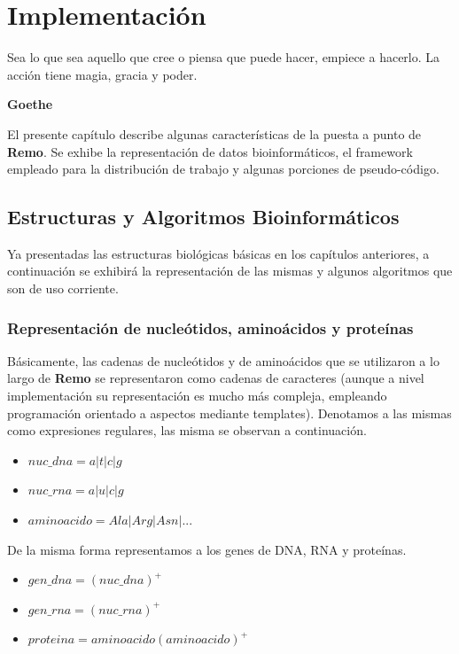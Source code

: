 \chapter{Implementación}
\label{implementacion}

\epigraph{Sea lo que sea aquello que cree
o piensa que puede hacer, empiece a hacerlo.
La acción tiene magia, gracia y poder.}%
{\textbf{Goethe}}

El presente capítulo describe algunas características de la puesta a punto de \textbf{Remo}. Se exhibe la representación de datos bioinformáticos, el framework empleado para la distribución de trabajo y algunas porciones de pseudo-código. 

\section{Estructuras y Algoritmos Bioinformáticos}	
\par Ya presentadas las estructuras biológicas básicas en los capítulos anteriores, a continuación se exhibirá la representación de las mismas y algunos algoritmos que son de uso corriente.

\subsection{Representación de nucleótidos, aminoácidos y proteínas}
\par Básicamente, las cadenas de nucleótidos y de aminoácidos que se utilizaron a lo largo de \textbf{Remo} se representaron como cadenas de caracteres (aunque a nivel implementación su representación es mucho más compleja, empleando programación orientado a aspectos mediante templates). Denotamos a las mismas como expresiones regulares, las misma se observan a continuación.
	
\begin{itemize}
	\item $nuc\_dna = a \vert t \vert c \vert g $
	\item $nuc\_rna = a \vert u \vert c \vert g  $	
	\item $aminoacido = Ala \vert Arg \vert Asn \vert ...$	
\end{itemize}
	
\par De la misma forma representamos a los genes de DNA, RNA y proteínas.
		
\begin{itemize}
	\item $gen\_dna = (nuc\_dna)^{+}$	
	\item $gen\_rna = (nuc\_rna)^{+}$	
	\item $proteina = aminoacido (aminoacido)^{+}$
\end{itemize}

